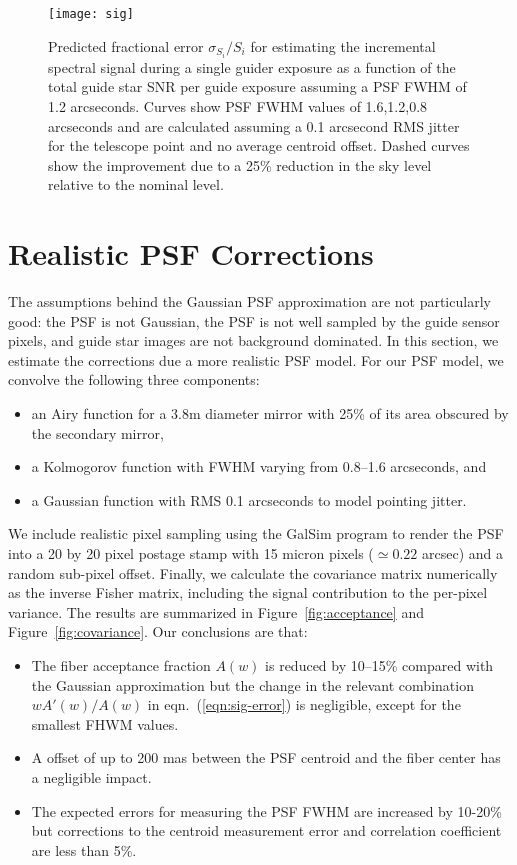 \documentclass[11pt]{article}
\providecommand{\eqn}[1]{eqn.~(\ref{eqn:#1})}
\providecommand{\fig}[1]{Figure~\ref{fig:#1}}
\begin{document}
\begin{figure}[htb]
\begin{center}
\texttt{[image: sig]}
\caption{Predicted fractional error $\sigma_{S_i}/S_i$ for estimating the incremental spectral signal during a single guider exposure as a function of the total guide star SNR per guide exposure assuming a PSF FWHM of 1.2 arcseconds. Curves show PSF FWHM values of 1.6,1.2,0.8 arcseconds and are calculated assuming a 0.1 arcsecond RMS jitter for the telescope point and no average centroid offset. Dashed curves show the improvement due to a 25\% reduction in the sky level relative to the nominal level.}
\label{fig:sigpar}
\end{center}
\end{figure}

\section{Realistic PSF Corrections}

The assumptions behind the Gaussian PSF approximation are not particularly good: the PSF is not Gaussian, the PSF is not well sampled by the guide sensor pixels, and guide star images are not background dominated. In this section, we estimate the corrections due a more realistic PSF model. For our PSF model, we convolve the following three components:
\begin{itemize}
\item an Airy function for a 3.8m diameter mirror with 25\% of its area obscured by the secondary mirror,
\item a Kolmogorov function with FWHM varying from 0.8--1.6 arcseconds, and
\item a Gaussian function with RMS 0.1 arcseconds to model pointing jitter.
\end{itemize}
We include realistic pixel sampling using the GalSim program to render the PSF into a 20 by 20 pixel postage stamp with 15 micron pixels ($\simeq 0.22$ arcsec) and a random sub-pixel offset. Finally, we calculate the covariance matrix numerically as the inverse Fisher matrix, including the signal contribution to the per-pixel variance. The results are summarized in \fig{acceptance} and \fig{covariance}. Our conclusions are that:
\begin{itemize}
\item The fiber acceptance fraction $A(w)$ is reduced by 10--15\% compared with the Gaussian approximation but the change in the relevant combination $w A'(w)/A(w)$ in \eqn{sig-error} is negligible, except for the smallest FHWM values.
\item A offset of up to 200 mas between the PSF centroid and the fiber center has a negligible impact.
\item The expected errors for measuring the PSF FWHM are increased by 10-20\% but corrections to the centroid measurement error and correlation coefficient are less than 5\%.
\end{itemize}
\end{document}
